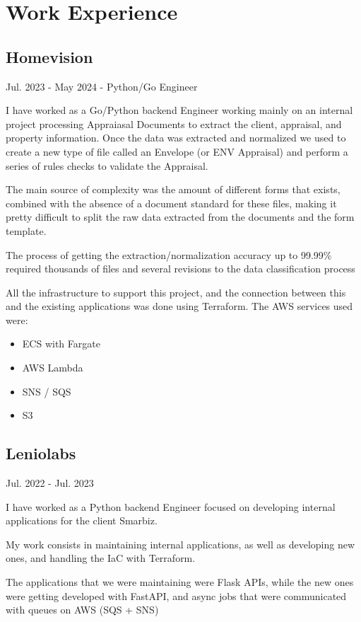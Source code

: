 \documentclass[11pt]{article}
\begin{document}
\section{Work Experience}
\label{sec:orgd533ae2}

\subsection{Homevision}
\label{sec:org07431bd}
Jul. 2023 - May 2024 - Python/Go Engineer

I have worked as a Go/Python backend Engineer working mainly on an internal project processing Appraiasal Documents to extract the client, appraisal, and property information.  
Once the data was extracted and normalized we used to create a new type of file called an Envelope (or ENV Appraisal) and perform a series of rules checks to validate the Appraisal.  

The main source of complexity was the amount of different forms that exists, combined with the absence of a document standard for these files, making it pretty difficult to split the raw data extracted from the documents and the form template.

The process of getting the extraction/normalization accuracy up to 99.99\% required thousands of files and several revisions to the data classification process

All the infrastructure to support this project, and the connection between this and the existing applications was done using Terraform.  
The AWS services used were:
\begin{itemize}
\item ECS with Fargate
\item AWS Lambda
\item SNS / SQS
\item S3
\end{itemize}

\subsection{Leniolabs}
\label{sec:orgbc1ffc4}
Jul. 2022 - Jul. 2023

I have worked as a Python backend Engineer focused on developing internal applications for the client Smarbiz.

My work consists in maintaining internal applications, as well as developing new ones, and handling the IaC with Terraform.

The applications that we were maintaining were Flask APIs, while the new ones were getting developed with FastAPI, and async jobs that were communicated with queues on AWS (SQS + SNS)
\end{document}
